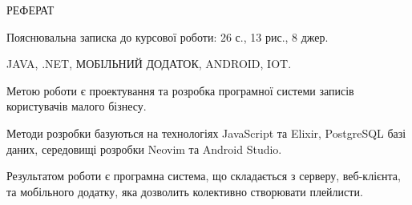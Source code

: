 \begin{center}
    РЕФЕРАТ 
\end{center}
\vspace*{\baselineskip}

Пояснювальна записка до курсової роботи: 26 с., 13 рис., 8 джер.

JAVA, .NET, МОБІЛЬНИЙ ДОДАТОК, ANDROID, IOT.
\vspace*{\baselineskip}

Метою роботи є проектування та розробка програмної системи записів користувачів малого бізнесу.

Методи розробки базуються на технологіях JavaScript та Elixir, PostgreSQL базі даних, середовищі розробки Neovim та Android Studio.

Результатом роботи є програмна система, що складається з серверу, веб-клієнта, та мобільного додатку, яка дозволить колективно створювати плейлисти.

\newpage
